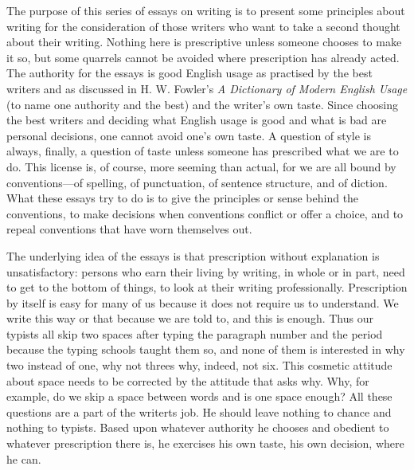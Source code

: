 \documentclass[
    oneside,
    11pt,
    draft
]{memoir}
\begin{document}
The purpose of this series of essays on writing is to present some principles about writing for the consideration of those writers who want to take a second thought about their writing. Nothing here is prescriptive unless someone chooses to make it so, but some quarrels cannot be avoided where prescription has already acted. The authority for the essays is good English usage as practised by the best writers and as discussed in H. W. Fowler's \emph{A Dictionary of Modern English Usage} (to name one authority and the best) and the writer's own taste. Since choosing the best writers and deciding what English usage is good and what is bad are personal decisions, one cannot avoid one's own taste. A question of style is always, finally, a question of taste unless someone has prescribed what we are to do. This license is, of course, more seeming than actual, for we are all bound by conventions---of spelling, of punctuation, of sentence structure, and of diction. What these essays try to do is to give the principles or sense behind the conventions, to make decisions when conventions conflict or offer a choice, and to repeal conventions that have worn themselves out.

The underlying idea of the essays is that prescription without explanation is unsatisfactory: persons who earn their living by writing, in whole or in part, need to get to the bottom of things, to look at their writing professionally. Prescription by itself is easy for many of us because it does not require us to understand. We write this way or that because we are told to, and this is enough. Thus our typists all skip two spaces after typing the paragraph number and the period because the typing schools taught them so, and none of them is interested in why two instead of one, why not threes why, indeed, not six. This cosmetic attitude about space needs to be corrected by the attitude that asks why. Why, for example, do we skip a space between words and is one space enough? All these questions are a part of the writerts job. He should leave nothing to chance and nothing to typists. Based upon whatever authority he chooses and obedient to whatever prescription there is, he exercises his own taste, his own decision, where he can.
\end{document}
